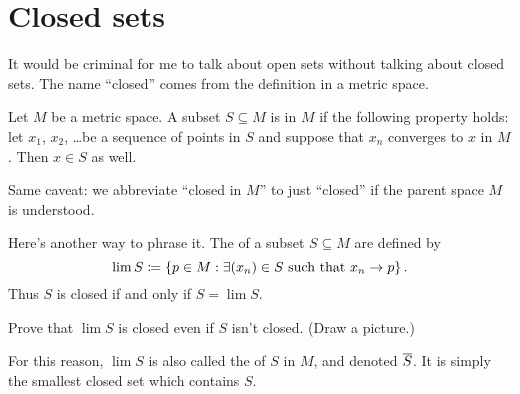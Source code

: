 
\section{Closed sets}
It would be criminal for me to talk about open sets
without talking about closed sets.
The name ``closed'' comes from the definition in a metric space.
\begin{definition}
	Let $M$ be a metric space.
	A subset $S \subseteq M$ is  in $M$ if the following property holds:
	let $x_1$, $x_2$, \dots be a sequence of points in $S$
	and suppose that $x_n$ converges to $x$ in $M$.
	Then $x \in S$ as well.
\end{definition}
\begin{abuse}
	Same caveat: we abbreviate ``closed in $M$'' to just ``closed''
	if the parent space $M$ is understood.
\end{abuse}
Here's another way to phrase it.
The  of a subset $S \subseteq M$ are defined by
\[ \lim S \coloneqq \left\{ p \in M :
	\exists (x_n) \in S \text{ such that } x_n \to p \right\}. \]
Thus $S$ is closed if and only if $S = \lim S$.

\begin{exercise}
	Prove that $\lim S$ is closed even if $S$ isn't closed. (Draw a picture.)
\end{exercise}
For this reason, $\lim S$ is also called the
 of $S$ in $M$, and denoted $\overline S$.
It is simply the smallest closed set which contains $S$.


